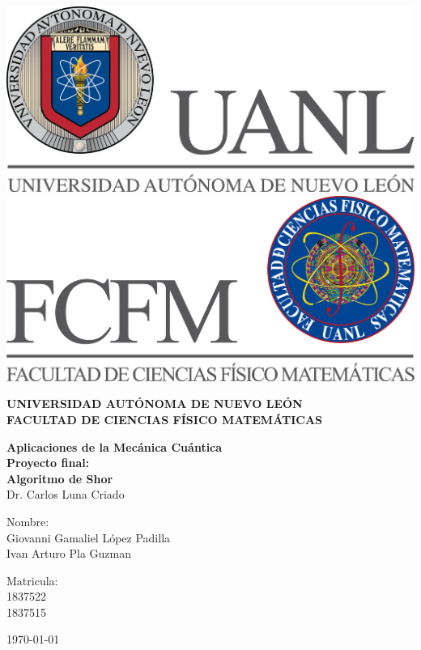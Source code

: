\begin{titlepage}
\begin{center}
\includegraphics[scale=0.40]{../../../Logos/uanl.png} 
\hspace{2.5cm}
\includegraphics[scale=0.40]{../../../Logos/fcfm.png}
\end{center}
\vspace{1.5cm}
\begin{center}
\large{\textbf{
UNIVERSIDAD AUTÓNOMA DE NUEVO LEÓN\\
FACULTAD DE CIENCIAS
FÍSICO MATEMÁTICAS}}\\
\vspace*{2.5cm}
\begin{large}
\textbf{Aplicaciones de la Mecánica Cuántica}\\
\textbf{Proyecto final:\\ Algoritmo de Shor \vspace{0.5cm}\\}
Dr. Carlos Luna Criado\\
\end{large}
\vspace{3.5cm}
\begin{minipage}{0.6\linewidth}
\vspace{0.5cm}
\changefontsizes{14pt}
Nombre:\\
Giovanni Gamaliel López Padilla\\
Ivan Arturo Pla Guzman\\
\end{minipage}
\begin{minipage}{0.2\linewidth}
\changefontsizes{14pt}
Matricula:\\
1837522\\
1837515
\end{minipage}
\end{center}
\vspace{4cm}
\begin{flushright}
\today
\end{flushright}
\pagebreak
\end{titlepage}